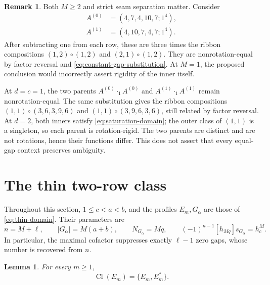 \documentclass[11pt,a4paper]{amsart}
\numberwithin{equation}{section}
\theoremstyle{plain}
\newtheorem{lemma}[theorem]{Lemma}
\theoremstyle{definition}
\newtheorem{remark}[theorem]{Remark}
\begin{document}
\begin{remark}\label{rem:saturation-boundaries}
Both \(M\ge2\) and strict seam separation matter.  Consider
\begin{equation}\label{eq:ambiguous-inners}
 \begin{aligned}
 A^{(0)}&=(4,7,4,10,7;1^4),\\
 A^{(1)}&=(4,10,7,4,7;1^4).
 \end{aligned}
\end{equation}
After subtracting one from each row, these are three times the ribbon
compositions \((1,2)\circ(1,2)\) and \((2,1)\circ(1,2)\).
They are nonrotation-equal by factor reversal and
\eqref{eq:constant-gap-substitution}.  At \(M=1\), the proposed
conclusion would incorrectly assert rigidity of the inner itself.

At \(d=c=1\), the two parents
\(A^{(0)}\cdot_1 A^{(0)}\) and
\(A^{(1)}\cdot_1 A^{(1)}\) remain nonrotation-equal.  The same
substitution gives the ribbon compositions
\((1,1)\circ(3,6,3,9,6)\) and
\((1,1)\circ(3,9,6,3,6)\), still related by factor reversal.
At \(d=2\), both inners satisfy \eqref{eq:saturation-domain}; the
outer class of \((1,1)\) is a singleton, so each parent is
rotation-rigid.  The two parents are distinct and are not rotations,
hence their functions differ.  This does not assert that every equal-gap
context preserves ambiguity.
\end{remark}

\section{The thin two-row class}\label{sec:thin-and-lowering}

Throughout this section, \(1\le c<a<b\), and the profiles
\(E_m,G_\alpha\) are those of \eqref{eq:thin-domain}.  Their parameters
are
\begin{equation}\label{eq:thin-readings}
 n=M+\ell,\qquad |G_\alpha|=M(a+b),\qquad N_{G_\alpha}=Mq,
 \qquad
 (-1)^{n-1}[h_{Mq}]s_{G_\alpha}=h_c^M.
\end{equation}
In particular, the maximal cofactor suppresses exactly \(\ell-1\)
zero gaps, whose number is recovered from \(n\).

\begin{lemma}\label{lem:two-row-power-rigidity}
For every \(m\ge1\),
\[
 \operatorname{Cl}(E_m)=\{E_m,E_m^*\}.
\]
\end{lemma}
\end{document}
